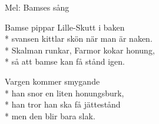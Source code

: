\begin{SongText}[Bamse]
    \begin{SongInfo}
        Mel: Bamses sång
    \end{SongInfo}
    \begin{SongVerse}
        Bamse pippar Lille-Skutt i baken\\*%
        svansen kittlar skön när man är naken.\\*%
        Skalman runkar, Farmor kokar honung,\\*%
        så att bamse kan få stånd igen.
    \end{SongVerse}
    \begin{SongVerse}
        Vargen kommer smygande\\*%
        han snor en liten honungsburk,\\*%
        han tror han ska få jättestånd\\*%
        men den blir bara slak.
    \end{SongVerse}
\end{SongText}
